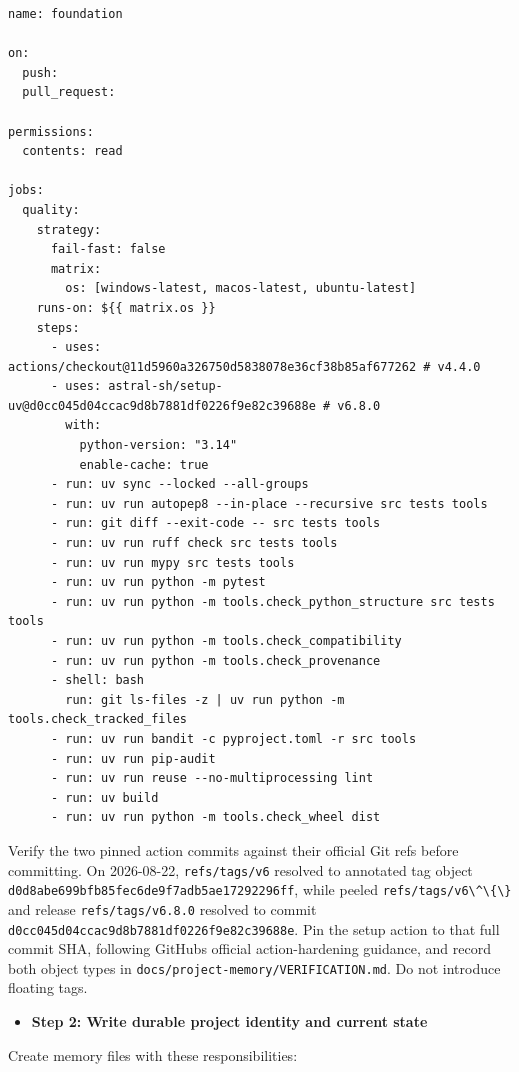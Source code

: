 \documentclass[
  letterpaper,
]{article}
\newcommand{\passthrough}[1]{#1}
\providecommand{\tightlist}{%
  \setlength{\itemsep}{0pt}\setlength{\parskip}{0pt}}
\begin{document}
\begin{lstlisting}
name: foundation

on:
  push:
  pull_request:

permissions:
  contents: read

jobs:
  quality:
    strategy:
      fail-fast: false
      matrix:
        os: [windows-latest, macos-latest, ubuntu-latest]
    runs-on: ${{ matrix.os }}
    steps:
      - uses: actions/checkout@11d5960a326750d5838078e36cf38b85af677262 # v4.4.0
      - uses: astral-sh/setup-uv@d0cc045d04ccac9d8b7881df0226f9e82c39688e # v6.8.0
        with:
          python-version: "3.14"
          enable-cache: true
      - run: uv sync --locked --all-groups
      - run: uv run autopep8 --in-place --recursive src tests tools
      - run: git diff --exit-code -- src tests tools
      - run: uv run ruff check src tests tools
      - run: uv run mypy src tests tools
      - run: uv run python -m pytest
      - run: uv run python -m tools.check_python_structure src tests tools
      - run: uv run python -m tools.check_compatibility
      - run: uv run python -m tools.check_provenance
      - shell: bash
        run: git ls-files -z | uv run python -m tools.check_tracked_files
      - run: uv run bandit -c pyproject.toml -r src tools
      - run: uv run pip-audit
      - run: uv run reuse --no-multiprocessing lint
      - run: uv build
      - run: uv run python -m tools.check_wheel dist
\end{lstlisting}

Verify the two pinned action commits against their official Git refs before committing. On 2026-08-22,
\nolinkurl{refs/tags/v6} resolved to annotated tag object \nolinkurl{d0d8abe699bfb85fec6de9f7adb5ae17292296ff}, while
peeled \passthrough{\lstinline!refs/tags/v6\^\{\}!} and release \nolinkurl{refs/tags/v6.8.0} resolved to commit
\nolinkurl{d0cc045d04ccac9d8b7881df0226f9e82c39688e}. Pin the setup action to that full commit SHA, following
GitHub\textquotesingle s official action-hardening guidance, and record both object types in
\nolinkurl{docs/project-memory/VERIFICATION.md}. Do not introduce floating tags.

\begin{itemize}
\tightlist
\item[$\boxtimes$]
  \textbf{Step 2: Write durable project identity and current state}
\end{itemize}

Create memory files with these responsibilities:
\end{document}
